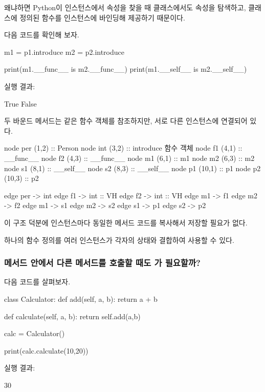 왜냐하면 Python이 인스턴스에서 속성을 찾을 때 클래스에서도 속성을 탐색하고, 클래스에 정의된 함수를 인스턴스에 바인딩해 제공하기 때문이다.

다음 코드를 확인해 보자.

\begin{dhkcode}
m1 = p1.introduce
m2 = p2.introduce

print(m1.__func__ is m2.__func__)
print(m1.__self__ is m2.__self__)
\end{dhkcode}

실행 결과:

\begin{dhkzsh}
True
False
\end{dhkzsh}

두 바운드 메서드는 같은 함수 객체를 참조하지만, 서로 다른 인스턴스에 연결되어 있다.

\begin{dhkdiagram}[in=6]
node per (1,2) :: Person
node int (3,2) :: introduce 함수 객체
node f1 (4,1) :: __func__
node f2 (4,3) :: __func__
node m1 (6,1) :: m1
node m2 (6,3) :: m2
node s1 (8,1) :: __self__
node s2 (8,3) :: __self__
node p1 (10,1) :: p1
node p2 (10,3) :: p2

edge per -> int
edge f1 -> int :: VH
edge f2 -> int :: VH
edge m1 -> f1
edge m2 -> f2
edge m1 -> s1
edge m2 -> s2
edge s1 -> p1
edge s2 -> p2
\end{dhkdiagram}

이 구조 덕분에 인스턴스마다 동일한 메서드 코드를 복사해서 저장할 필요가 없다.

하나의 함수 정의를 여러 인스턴스가 각자의 상태와 결합하여 사용할 수 있다.

\subsubsection{메서드 안에서 다른 메서드를 호출할 때도 가 필요할까?}

다음 코드를 살펴보자.

\begin{dhkcode}
class Calculator:
    def add(self, a, b):
        return a + b

    def calculate(self, a, b):
        return self.add(a,b)


calc = Calculator()

print(calc.calculate(10,20))
\end{dhkcode}

실행 결과:

\begin{dhkzsh}
30
\end{dhkzsh}

